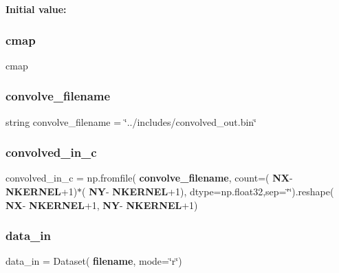 {\bfseries Initial value\+:}
\begin{DoxyCode}{0}
\DoxyCodeLine{1 =  np.array ([}
\DoxyCodeLine{5     ])}

\end{DoxyCode}
\mbox{\label{namespacemain_a4c8205fdd592e54d9c16836d2ff77988}} 
\subsubsection{cmap}
{\footnotesize\ttfamily cmap}

\mbox{\label{namespacemain_a1cd3d2ecfb0e2170ec3d5f0ae393a29b}} 
\subsubsection{convolve\_filename}
{\footnotesize\ttfamily string convolve\+\_\+filename = \char`\"{}../includes/convolved\+\_\+out.\+bin\char`\"{}}

\mbox{\label{namespacemain_ab3d0a6718d75deb15300ebcf87fcc137}} 
\subsubsection{convolved\_in\_c}
{\footnotesize\ttfamily convolved\+\_\+in\+\_\+c = np.\+fromfile(\textbf{ convolve\+\_\+filename}, count=(\textbf{ NX}-\/\textbf{ N\+K\+E\+R\+N\+EL}+1)$\ast$(\textbf{ NY}-\/\textbf{ N\+K\+E\+R\+N\+EL}+1), dtype=np.\+float32,sep=\char`\"{}\char`\"{}).reshape(\textbf{ NX}-\/\textbf{ N\+K\+E\+R\+N\+EL}+1,\textbf{ NY}-\/\textbf{ N\+K\+E\+R\+N\+EL}+1)}

\mbox{\label{namespacemain_a4c82e11912544a563701839da5cd255f}} 
\subsubsection{data\_in}
{\footnotesize\ttfamily data\+\_\+in = Dataset(\textbf{ filename}, mode=\char`\"{}r\char`\"{})}

\mbox{\label{namespacemain_a3a1a90139c2c8ab1fca0ea8b1790b7b2}} 
